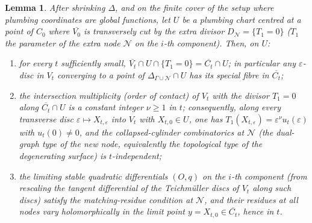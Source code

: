 \documentclass[11pt]{article}
\newtheorem{lem}[thm]{Lemma}
\theoremstyle{definition}
\theoremstyle{remark}
\begin{document}
\begin{lem}\label{lem:slope}
After shrinking $\Delta$, and on the finite cover of the setup
where plumbing coordinates are global functions, let $U$ be a plumbing
chart centred at a point of $C_0$ where $\overline{V_0}$ is transversely
cut by the extra divisor $D_{\mathcal N} = \{T_1 = 0\}$
($T_1$ the parameter of the extra node $\mathcal N$ on the $i$-th
component). Then, on $U$:
\begin{enumerate}[label=(\arabic*)]
\item for every $t$ sufficiently small, $\overline{V_t} \cap U
\cap \{T_1 = 0\} = \overline{C_t} \cap U$; in particular any
$\varepsilon$-disc in $V_t$ converging to a point of
$\Delta_{\Gamma \cup \mathcal N} \cap U$ has its special fibre in
$\overline{C_t}$;
\item the intersection multiplicity (order of contact) of $V_t$ with the
divisor $T_1 = 0$ along $\overline{C_t} \cap U$ is a constant integer
$\nu \ge 1$ in $t$; consequently, along every transverse disc
$\varepsilon \mapsto X_{t,\varepsilon}$ into $V_t$ with
$X_{t,0} \in U$, one has
$T_1(X_{t,\varepsilon}) = \varepsilon^\nu u_{t}(\varepsilon)$ with
$u_t(0) \neq 0$, and the collapsed-cylinder combinatorics at $\mathcal N$
(the dual-graph type of the new node, equivalently the topological type of
the degenerating surface) is $t$-independent;
\item the limiting stable quadratic differentials $(O,q)$ on the $i$-th
component (from rescaling the tangent differential of the Teichm\"uller
discs of $V_t$ along such discs) satisfy the matching-residue condition
at $\mathcal N$, and their residues at all nodes vary holomorphically in
the limit point $y = X_{t,0} \in \overline{C_t}$, hence in $t$.
\end{enumerate}
\end{lem}
\end{document}
